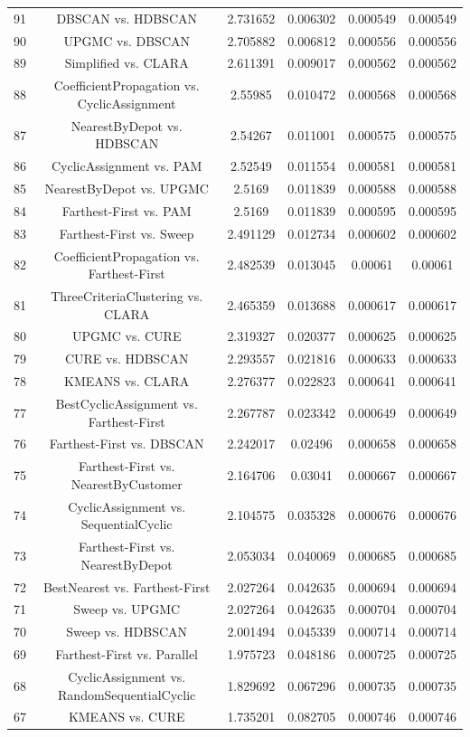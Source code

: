 \documentclass[a4paper,10pt]{article}
\begin{document}
\begin{landscape}
\begin{table}[!htp]
\begin{tabular}{cccccc}
91&DBSCAN vs. HDBSCAN&2.731652&0.006302&0.000549&0.000549\\
90&UPGMC vs. DBSCAN&2.705882&0.006812&0.000556&0.000556\\
89&Simplified vs. CLARA&2.611391&0.009017&0.000562&0.000562\\
88&CoefficientPropagation vs. CyclicAssignment&2.55985&0.010472&0.000568&0.000568\\
87&NearestByDepot vs. HDBSCAN&2.54267&0.011001&0.000575&0.000575\\
86&CyclicAssignment vs. PAM&2.52549&0.011554&0.000581&0.000581\\
85&NearestByDepot vs. UPGMC&2.5169&0.011839&0.000588&0.000588\\
84&Farthest-First vs. PAM&2.5169&0.011839&0.000595&0.000595\\
83&Farthest-First vs. Sweep&2.491129&0.012734&0.000602&0.000602\\
82&CoefficientPropagation vs. Farthest-First&2.482539&0.013045&0.00061&0.00061\\
81&ThreeCriteriaClustering vs. CLARA&2.465359&0.013688&0.000617&0.000617\\
80&UPGMC vs. CURE&2.319327&0.020377&0.000625&0.000625\\
79&CURE vs. HDBSCAN&2.293557&0.021816&0.000633&0.000633\\
78&KMEANS vs. CLARA&2.276377&0.022823&0.000641&0.000641\\
77&BestCyclicAssignment vs. Farthest-First&2.267787&0.023342&0.000649&0.000649\\
76&Farthest-First vs. DBSCAN&2.242017&0.02496&0.000658&0.000658\\
75&Farthest-First vs. NearestByCustomer&2.164706&0.03041&0.000667&0.000667\\
74&CyclicAssignment vs. SequentialCyclic&2.104575&0.035328&0.000676&0.000676\\
73&Farthest-First vs. NearestByDepot&2.053034&0.040069&0.000685&0.000685\\
72&BestNearest vs. Farthest-First&2.027264&0.042635&0.000694&0.000694\\
71&Sweep vs. UPGMC&2.027264&0.042635&0.000704&0.000704\\
70&Sweep vs. HDBSCAN&2.001494&0.045339&0.000714&0.000714\\
69&Farthest-First vs. Parallel&1.975723&0.048186&0.000725&0.000725\\
68&CyclicAssignment vs. RandomSequentialCyclic&1.829692&0.067296&0.000735&0.000735\\
67&KMEANS vs. CURE&1.735201&0.082705&0.000746&0.000746\\

\end{tabular}
\end{table}
\end{landscape}
\end{document}
